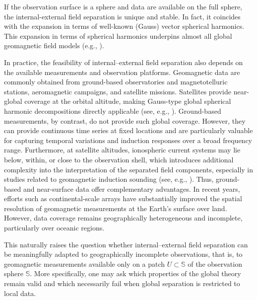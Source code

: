 \documentclass[a4paper, 11pt]{article}
\renewcommand{\SS}{\mathbb{S}}
\begin{document}
If the observation surface is a sphere and data are available on the full sphere, the internal-external field separation is unique and stable. In fact, it coincides with the expansion in terms of well-known (Gauss) vector spherical harmonics. This expansion in terms of spherical harmonics underpins almost all global geomagnetic field models (e.g., \cite{Alken2021,olsen20,lesur10,emag2,sabaka20}). 






In practice, the feasibility of internal--external field separation also depends on the available measurements and observation platforms. Geomagnetic data are commonly obtained from ground-based observatories and magnetotelluric stations, aeromagnetic campaigns, and satellite missions. Satellites provide near-global coverage at the orbital altitude, making Gauss-type global spherical harmonic decompositions directly applicable (see, e.g., \cite{olsen15,Olsen2012}). Ground-based measurements, by contrast, do not provide such global coverage. However, they can provide continuous time series at fixed locations and are particularly valuable for capturing temporal variations and induction responses over a broad frequency range. Furthermore, at satellite altitudes, ionospheric current systems may lie below, within, or close to the observation shell, which introduces additional complexity into the interpretation of the separated field components, especially in studies related to geomagnetic induction sounding (see, e.g., \cite{gray24,kuv12,kuv15,ren25}). Thus, ground-based and near-surface data offer complementary advantages. In recent years, efforts such as continental-scale arrays have substantially improved the spatial resolution of geomagnetic measurements at the Earth's surface over land. However, data coverage remains geographically heterogeneous and incomplete, particularly over oceanic regions. 

This naturally raises the question whether internal--external field separation can be meaningfully adapted to geographically incomplete observations, that is, to geomagnetic measurements available only on a patch $U \subset \SS$ of the observation sphere $\SS$. More specifically, one may ask which properties of the global theory remain valid and which necessarily fail when global separation is restricted to local data.
\end{document}
